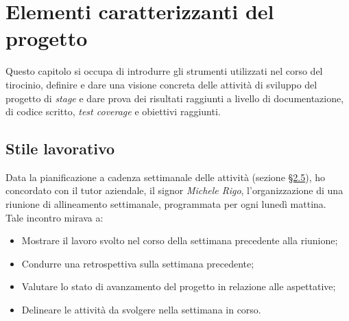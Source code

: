 \chapter{Elementi caratterizzanti del progetto}
\label{cap:elementi-progetto}
Questo capitolo si occupa di introdurre gli strumenti utilizzati nel corso del tirocinio, definire e dare una visione concreta delle attività di sviluppo del progetto di \textit{stage} e dare prova dei risultati raggiunti 
a livello di documentazione, di codice scritto, \textit{test coverage} e obiettivi raggiunti. 

\section{Stile lavorativo}

Data la pianificazione a cadenza settimanale delle attività (sezione \hyperref[sec:pianificazione]{§2.5}), ho concordato con il tutor aziendale, il signor \textit{Michele Rigo}, l'organizzazione di una riunione di allineamento settimanale, programmata per ogni lunedì mattina. \\
Tale incontro mirava a:
\begin{itemize}
    \item Mostrare il lavoro svolto nel corso della settimana precedente alla riunione;
    \item Condurre una retrospettiva sulla settimana precedente;
    \item Valutare lo stato di avanzamento del progetto in relazione alle aspettative;
    \item Delineare le attività da svolgere nella settimana in corso.
\end{itemize}

